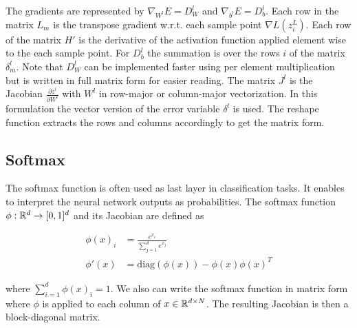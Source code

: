 \documentclass[english,11pt,a4paper]{article}
\begin{document}
The gradients are represented by $\nabla_{W^l}E = D^l_W$ and $\nabla_{b^l}E = D^l_b$. Each row in the matrix $L_m$ is the transpose gradient w.r.t. each sample point $\nabla L(z^L_i)$. Each row of the matrix $H'$ is the derivative of the activation function applied element wise to the each sample point. For $D^l_b$ the summation is over the rows $i$ of the matrix $\delta^l_m$. Note that $D^l_W$ can be implemented faster using per element multiplication but is written in full matrix form for easier reading. The matrix $J^l$ is the Jacobian $\frac{\partial z^l}{\partial W^l}$ with $W^l$ in row-major or column-major vectorization. In this formulation the vector version of the error variable $\delta^l$ is used. The reshape function extracts the rows and columns accordingly to get the matrix form.

\subsection{Softmax}

The softmax function is often used as last layer in classification tasks. It enables to interpret the neural network outputs as probabilities. The softmax function $\phi: \mathbb{R}^d \to [0,1]^d$ and its Jacobian are defined as

\begin{equation}
	\begin{aligned}
		\phi(x)_i &= \frac{e^{x_i}}{\sum_{j=1}^{d} e^{x_j}} \\
		\phi'(x) &= \text{diag}(\phi(x)) - \phi(x) \phi(x)^T
	\end{aligned}
\end{equation}

where $\sum_{i=1}^{d}\phi(x)_i = 1$. We also can write the softmax function in matrix form where $\phi$ is applied to each column of $x \in \mathbb{R}^{d \times N}$. The resulting Jacobian is then a block-diagonal matrix.
\end{document}
